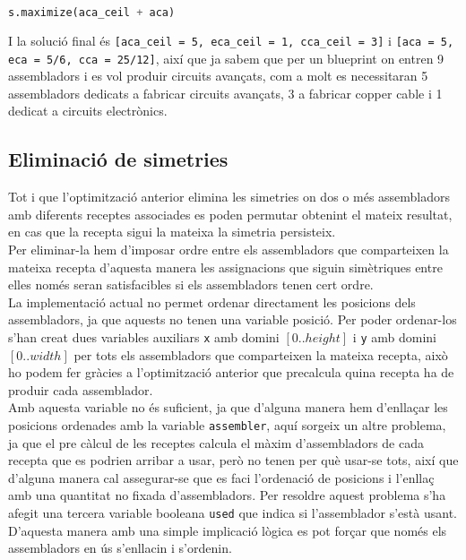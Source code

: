 \begin{lstlisting}[language=Python, caption=Optimization]
s.maximize(aca_ceil + aca)
\end{lstlisting}

I la solució final és \lstinline{[aca_ceil = 5, eca_ceil = 1, cca_ceil = 3]} i \lstinline{[aca = 5, eca = 5/6, cca = 25/12]}, així que ja sabem que per un blueprint on entren 9 assembladors i es vol produir circuits avançats, com a molt es necessitaran 5 assembladors dedicats a fabricar circuits avançats, 3 a fabricar copper cable i 1 dedicat a circuits electrònics.

\subsection{Eliminació de simetries}
Tot i que l'optimització anterior elimina les simetries on dos o més assembladors amb diferents receptes associades es poden permutar obtenint el mateix resultat, en cas que la recepta sigui la mateixa la simetria persisteix.\\

Per eliminar-la hem d'imposar ordre entre els assembladors que comparteixen la mateixa recepta d'aquesta manera les assignacions que siguin simètriques entre elles només seran satisfacibles si els assembladors tenen cert ordre.\\
La implementació actual no permet ordenar directament les posicions dels assembladors, ja que aquests no tenen una variable posició. Per poder ordenar-los s'han creat dues variables auxiliars \lstinline{x} amb domini $[0..height]$ i \lstinline{y} amb domini $[0..width]$ per tots els assembladors que comparteixen la mateixa recepta, això ho podem fer gràcies a l'optimització anterior que precalcula quina recepta ha de produir cada assemblador.\\
Amb aquesta variable no és suficient, ja que d'alguna manera hem d'enllaçar les posicions ordenades amb la variable \lstinline{assembler}, aquí sorgeix un altre problema, ja que el pre càlcul de les receptes calcula el màxim d'assembladors de cada recepta que es podrien arribar a usar, però no tenen per què usar-se tots, així que d'alguna manera cal assegurar-se que es faci l'ordenació de posicions i l'enllaç amb una quantitat no fixada d'assembladors. Per resoldre aquest problema s'ha afegit una tercera variable booleana \lstinline{used} que indica si l'assemblador s'està usant. D'aquesta manera amb una simple implicació lògica es pot forçar que només els assembladors en ús s'enllacin i s'ordenin.\\

